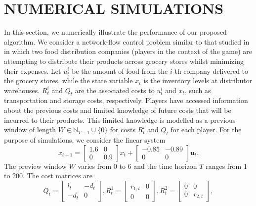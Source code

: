 \documentclass[letterpaper, 10 pt, conference]{ieeeconf}  %
\begin{document}
\section{NUMERICAL SIMULATIONS}\label{sec:numerical}
In this section, we numerically illustrate the performance of our proposed algorithm. We consider a network-flow control problem similar to that studied in \cite[Section VI]{zazo_dynamic_2016} in which two food distribution companies (players in the context of the game) are attempting to distribute their products across grocery stores whilst minimizing their expenses. Let $u_{t}^{i}$ be the amount of food from the $i$-th company delivered to the grocery stores, while the state variable $x_{t}$ is the inventory levels at distributor warehouses. $R_{t}^{i}$ and $Q_{t}$ are the associated costs to $u_{t}^{i}$ and $x_{t}$, such as transportation and storage costs, respectively. Players have accessed information about the previous costs and limited knowledge of future costs that will be incurred to their products. This limited knowledge is modelled as a previous window of length $W \in \mathbb{N}_{T-1}\cup \{0\}$ for costs $R_{t}^{i}$ and $Q_{t}$ for each player.
For the purpose of simulations, we consider the linear system
\begin{equation*}
    x_{t+1} = 
    \begin{bmatrix}
        1.6 & 0\\
        0 & 0.9
    \end{bmatrix}
    x_{t} + 
    \begin{bmatrix}
        -0.85 & -0.89\\
        0 & 0
    \end{bmatrix}\mathbf{u}_{t}.
\end{equation*}
The preview window $W$ varies from 0 to 6 and the time horizon $T$ ranges from 1 to 200. The cost matrices are
\begin{equation*}
    Q_{t} = 
    \begin{bmatrix}
        l_{t} & -d_{t}\\
        -d_{t} & 0
    \end{bmatrix},
    R_{t}^{1} = 
    \begin{bmatrix}
        r_{1,t} & 0\\
        0 & 0
    \end{bmatrix},
    R_{t}^{2} = 
    \begin{bmatrix}
        0 & 0\\
        0 & r_{2,t}
    \end{bmatrix},
\end{equation*}
\end{document}
